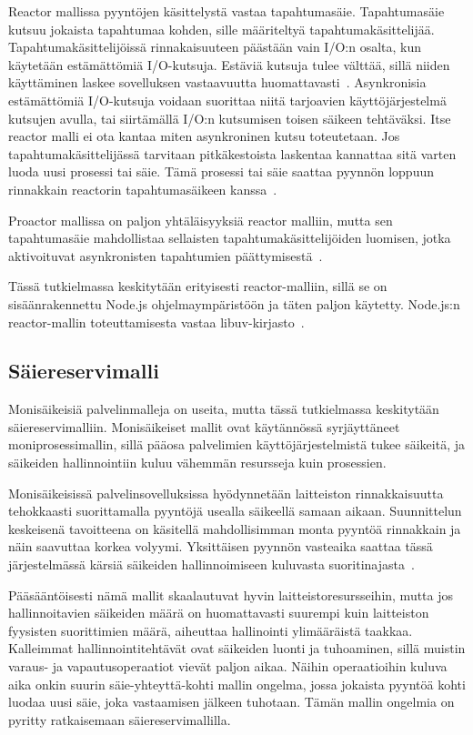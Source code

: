 \documentclass[12pt]{article}
\begin{document}
Reactor mallissa pyyntöjen käsittelystä
vastaa tapahtumasäie.
Tapahtumasäie kutsuu jokaista tapahtumaa kohden, sille
määriteltyä tapahtumakäsittelijää.
Tapahtumakäsittelijöissä rinnakaisuuteen päästään
vain I/O:n osalta, kun käytetään estämättömiä
I/O-kutsuja.
Estäviä kutsuja tulee välttää,
sillä niiden käyttäminen laskee sovelluksen
vastaavuutta huomattavasti~\cite{schmidt_reactor:_1995}.
Asynkronisia estämättömiä I/O-kutsuja 
voidaan suorittaa niitä tarjoavien käyttöjärjestelmä kutsujen
avulla, tai siirtämällä I/O:n kutsumisen toisen säikeen tehtäväksi.
Itse reactor malli ei ota kantaa miten asynkroninen kutsu toteutetaan.
Jos tapahtumakäsittelijässä tarvitaan pitkäkestoista laskentaa
kannattaa sitä varten luoda uusi prosessi tai säie. Tämä
prosessi tai säie saattaa pyynnön loppuun rinnakkain 
reactorin tapahtumasäikeen kanssa~\cite{schmidt_reactor:_1995}.


Proactor mallissa on paljon yhtäläisyyksiä reactor malliin, mutta sen
tapahtumasäie mahdollistaa sellaisten tapahtumakäsittelijöiden 
luomisen, jotka aktivoituvat asynkronisten tapahtumien päättymisestä~\cite{pyryali_proactor_1997}.


 Tässä tutkielmassa keskitytään erityisesti
reactor-malliin, sillä se on sisäänrakennettu Node.js ohjelmaympäristöön ja
täten paljon käytetty. Node.js:n reactor-mallin toteuttamisesta vastaa
libuv-kirjasto~\cite{libuv_design_2019}.

\subsection{Säiereservimalli}
Monisäikeisiä palvelinmalleja on useita, mutta tässä tutkielmassa keskitytään säiereservimalliin.
Monisäikeiset mallit ovat käytännössä syrjäyttäneet moniprosessimallin, sillä pääosa
palvelimien käyttöjärjestelmistä tukee säikeitä, ja säikeiden hallinnointiin
kuluu vähemmän resursseja kuin prosessien.

Monisäikeisissä palvelinsovelluksissa hyödynnetään laitteiston
rinnakkaisuutta tehokkaasti suorittamalla pyyntöjä usealla säikeellä samaan
aikaan. Suunnittelun keskeisenä
tavoitteena on käsitellä mahdollisimman monta pyyntöä rinnakkain ja 
näin saavuttaa korkea volyymi. Yksittäisen pyynnön
vasteaika saattaa tässä
järjestelmässä kärsiä säikeiden hallinnoimiseen kuluvasta suoritinajasta~\cite{easton_developing_2004}.

Pääsääntöisesti nämä mallit skaalautuvat hyvin laitteistoresursseihin,
mutta jos hallinnoitavien säikeiden määrä on huomattavasti suurempi kuin laitteiston
fyysisten suorittimien määrä, aiheuttaa hallinointi ylimääräistä taakkaa.
Kalleimmat hallinnointitehtävät ovat säikeiden luonti ja tuhoaminen, sillä
muistin varaus- ja vapautusoperaatiot vievät paljon aikaa.
Näihin operaatioihin kuluva aika onkin suurin säie-yhteyttä-kohti mallin
ongelma, jossa jokaista pyyntöä kohti
luodaa uusi säie, joka vastaamisen jälkeen tuhotaan.
Tämän mallin ongelmia on pyritty ratkaisemaan säiereservimallilla.
\end{document}
